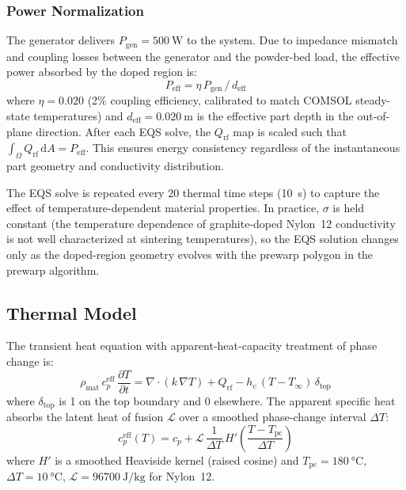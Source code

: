 \documentclass[10pt,twocolumn]{article}
\newcommand{\Qrf}{Q_{\mathrm{rf}}}
\newcommand{\Tpc}{T_{\mathrm{pc}}}
\begin{document}
\subsubsection{Power Normalization}

The generator delivers $P_{\mathrm{gen}} = \SI{500}{\watt}$ to the
system.  Due to impedance mismatch and coupling losses between the
generator and the powder-bed load, the effective power absorbed by the
doped region is:
\begin{equation}
  P_{\mathrm{eff}} = \eta\,P_{\mathrm{gen}}\,/\,d_{\mathrm{eff}}
  \label{eq:power_eff}
\end{equation}
where $\eta = 0.020$ (2\% coupling efficiency, calibrated to match
COMSOL steady-state temperatures) and $d_{\mathrm{eff}} =
\SI{0.020}{\meter}$ is the effective part depth in the out-of-plane
direction.  After each EQS solve, the $\Qrf$ map is scaled such that
$\int_\Omega \Qrf\,\mathrm{d}A = P_{\mathrm{eff}}$.  This ensures
energy consistency regardless of the instantaneous part geometry and
conductivity distribution.

The EQS solve is repeated every 20 thermal time steps (\SI{10}{\second})
to capture the effect of temperature-dependent material properties.
In practice, $\sigma$ is held constant (the temperature dependence
of graphite-doped Nylon~12 conductivity is not well characterized at
sintering temperatures), so the EQS solution changes only as the
doped-region geometry evolves with the prewarp polygon in the prewarp
algorithm.

\subsection{Thermal Model}
\label{sec:thermal_model}

The transient heat equation with apparent-heat-capacity treatment of
phase change is:
\begin{equation}
  \rho_{\mathrm{mat}}\,c_p^{\mathrm{eff}}\,\frac{\partial T}{\partial t}
  = \nabla\cdot(k\,\nabla T) + \Qrf - h_c\,(T - T_\infty)\,\delta_{\mathrm{top}}
  \label{eq:heat_eqn}
\end{equation}
where $\delta_{\mathrm{top}}$ is 1 on the top boundary and 0
elsewhere.  The apparent specific heat absorbs the latent heat of
fusion $\mathcal{L}$ over a smoothed phase-change interval $\Delta T$:
\begin{equation}
  c_p^{\mathrm{eff}}(T) = c_p + \mathcal{L}\,
  \frac{1}{\Delta T}\,H'\!\left(\frac{T - \Tpc}{\Delta T}\right)
  \label{eq:apparent_cp}
\end{equation}
where $H'$ is a smoothed Heaviside kernel (raised cosine) and
$\Tpc = \SI{180}{\celsius}$, $\Delta T = \SI{10}{\celsius}$,
$\mathcal{L} = \SI{96700}{\joule\per\kilogram}$ for Nylon~12.
\end{document}
